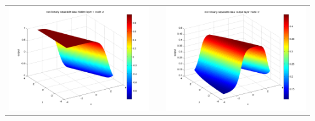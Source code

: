 \documentclass[fleqn]{article}
\begin{document}
\begin{center}
\begin{longtable}{ c | c | r }
    \includegraphics[scale=0.25]{./pics/nonlinearlyseparable/_4_2/_4_2_epoch_10_hidden layer 1 :2} &  & \includegraphics[scale=0.25]{./pics/nonlinearlyseparable/_4_2/_4_2_epoch_10_output layer :2} \\ 

\end{longtable}
\end{center}
\end{document}
